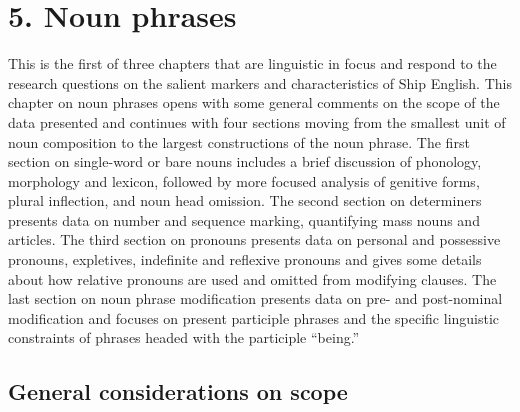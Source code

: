 \chapter{\textbf{5.} \textbf{Noun} \textbf{phrases}}

This is the first of three chapters that are linguistic in focus and respond to the research questions on the salient markers and characteristics of Ship English. This chapter on noun phrases opens with some general comments on the scope of the data presented and continues with four sections moving from the smallest unit of noun composition to the largest constructions of the noun phrase. The first section on single-word or bare nouns includes a brief discussion of phonology, morphology and lexicon, followed by more focused analysis of genitive forms, plural inflection, and noun head omission. The second section on determiners presents data on number and sequence marking, quantifying mass nouns and articles. The third section on pronouns presents data on personal and possessive pronouns, expletives, indefinite and reflexive pronouns and gives some details about how relative pronouns are used and omitted from modifying clauses. The last section on noun phrase modification presents data on pre- and post-nominal modification and focuses on present participle phrases and the specific linguistic constraints of phrases headed with the participle “being.” 

\section{\textbf{General} \textbf{considerations} \textbf{on} \textbf{scope}}%

